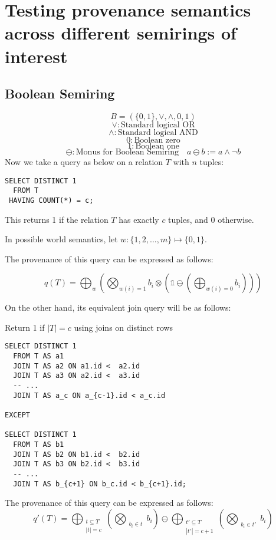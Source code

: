 \section{Testing provenance semantics across different semirings of interest}

\subsection{Boolean Semiring}
$$B = (\{0,1\}, \lor, \land, 0, 1)$$
$$\lor : \text{Standard logical OR}$$
$$\land : \text{Standard logical AND}$$
$$0 : \text{Boolean zero}$$
$$1 : \text{Boolean one}$$
\[
\ominus: \text{Monus for Boolean Semiring} \quad a \ominus b := a \land \neg b
\]
Now we take a query as below on a relation $T$ with $n$ tuples:

\begin{listing}[ht]
\begin{verbatim}
SELECT DISTINCT 1
  FROM T
 HAVING COUNT(*) = c;
\end{verbatim}
\end{listing}

This returns 1 if the relation $T$ has exactly $c$ tuples, and 0 otherwise.

In possible world semantics, let $w: \{1,2,\dots,m\} \mapsto \{0,1\}$.

The provenance of this query can be expressed as follows:

$$q(T) = \bigoplus_{w}\left(\bigotimes_{w(i)=1}b_i\otimes\left(\mathbb{1}\ominus(\bigoplus_{w(i) =0}b_i)\right)\right)$$

On the other hand, its equivalent join query will be as follows:

\begin{listing}[ht]
\caption{Return 1 if \(|T| = c\) using joins on distinct rows}
\begin{verbatim}
SELECT DISTINCT 1
  FROM T AS a1
  JOIN T AS a2 ON a1.id <  a2.id
  JOIN T AS a3 ON a2.id <  a3.id
  -- ...
  JOIN T AS a_c ON a_{c-1}.id < a_c.id

EXCEPT

SELECT DISTINCT 1
  FROM T AS b1
  JOIN T AS b2 ON b1.id <  b2.id
  JOIN T AS b3 ON b2.id <  b3.id
  -- ...
  JOIN T AS b_{c+1} ON b_c.id < b_{c+1}.id;
\end{verbatim}
\end{listing}

The provenance of this query can be expressed as follows:
\[
q'(T) = \bigoplus_{\substack{t\subseteq T \\ |t| = c}}\left(\bigotimes_{\substack{b_i\in t}}b_i\right) \ominus \bigoplus_{\substack{t'\subseteq T \\ |t'| = c+1}}\left(\bigotimes_{\substack{b_i\in t'}}b_i\right)
\]


